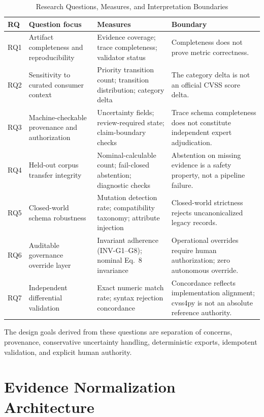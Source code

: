 \documentclass[conference]{IEEEtran}
\begin{document}
\begin{table}[t]
\caption{Research Questions, Measures, and Interpretation Boundaries}
\label{tab:rq}
\centering
\small
\begin{tabular}{@{}p{}p{}p{}p{}@{}}
\toprule
RQ & Question focus & Measures & Boundary \\
\midrule
RQ1 & Artifact completeness and reproducibility &
Evidence coverage; trace completeness; validator status &
Completeness does not prove metric correctness. \\
RQ2 & Sensitivity to curated consumer context &
Priority transition count; transition distribution; category delta &
The category delta is not an official CVSS score delta. \\
RQ3 & Machine-checkable provenance and authorization &
Uncertainty fields; review-required state; claim-boundary checks &
Trace schema completeness does not constitute independent expert adjudication. \\
RQ4 & Held-out corpus transfer integrity &
Nominal-calculable count; fail-closed abstention; diagnostic checks &
Abstention on missing evidence is a safety property, not a pipeline failure. \\
RQ5 & Closed-world schema robustness &
Mutation detection rate; compatibility taxonomy; attribute injection &
Closed-world strictness rejects uncanonicalized legacy records. \\
RQ6 & Auditable governance override layer &
Invariant adherence (INV-G1--G8); nominal Eq.~8 invariance &
Operational overrides require human authorization; zero autonomous override. \\
RQ7 & Independent differential validation &
Exact numeric match rate; syntax rejection concordance &
Concordance reflects implementation alignment; cvss4py is not an absolute reference authority. \\
\bottomrule
\end{tabular}
\end{table}

The design goals derived from these questions are separation of concerns,
provenance, conservative uncertainty handling, deterministic exports,
idempotent validation, and explicit human authority.

\section{Evidence Normalization Architecture}
\end{document}

